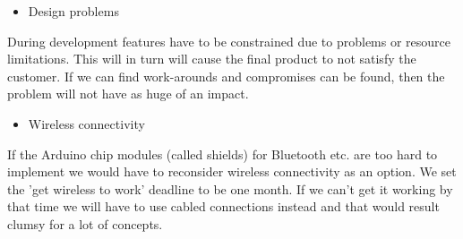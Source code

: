 \begin{itemize}
\item Design problems
\end{itemize}
During development features have to be constrained due to problems or resource limitations.
This will in turn will cause the final product to not satisfy the customer. If we can find work-arounds
and compromises can be found, then the problem will not have as huge of an impact.

\begin{itemize}
\item Wireless connectivity
\end{itemize}
If the Arduino chip modules (called shields) for Bluetooth etc. are too hard to implement
we would have to reconsider wireless connectivity as an option.
We set the 'get wireless to work' deadline to be one month. If we can't get it working
by that time we will have to use cabled connections instead and that would result clumsy
for a lot of concepts.

